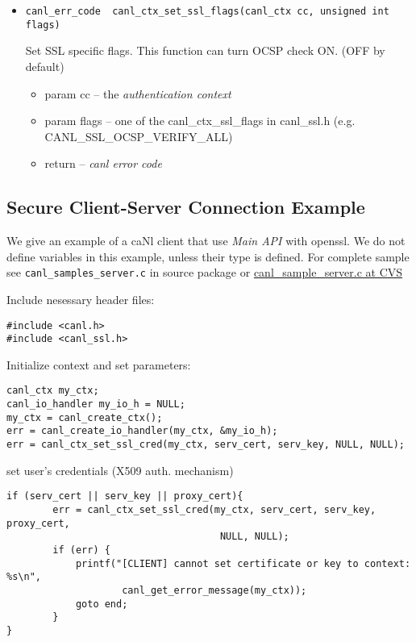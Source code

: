 \begin{itemize}
  \item \begin{verbatim}canl_err_code  canl_ctx_set_ssl_flags(canl_ctx cc, unsigned int flags) \end{verbatim}
  Set SSL specific flags. This function can turn OCSP check ON. 
  (OFF by default)
  \begin{itemize}
    \item param cc -- the \textit{authentication context}
    \item param flags -- one of the canl\_ctx\_ssl\_flags in canl\_ssl.h (e.g. 
  CANL\_SSL\_OCSP\_VERIFY\_ALL)
    \item return -- \textit{canl error code}
  \end{itemize}

\end{itemize}
\subsection{Secure Client-Server Connection Example}
We give an example of a caNl client that use \textit{Main API} 
with openssl. We do not define variables in this example, unless
their type is \CANL defined. For complete sample see 
{\tt canl\_samples\_server.c} in source package or \href{http://glite.cvs.cern.ch/cgi-bin/glite.cgi/emi.canl.canl-c/examples/canl\_sample\_server.c?revision=HEAD}{canl\_sample\_server.c at CVS}

Include nesessary header files:
\begin{lstlisting}
#include <canl.h>
#include <canl_ssl.h>
\end{lstlisting}

Initialize context and set parameters:
\begin{lstlisting}
canl_ctx my_ctx;
canl_io_handler my_io_h = NULL;
my_ctx = canl_create_ctx();
err = canl_create_io_handler(my_ctx, &my_io_h);
err = canl_ctx_set_ssl_cred(my_ctx, serv_cert, serv_key, NULL, NULL);
\end{lstlisting}

set user's credentials (X509 auth. mechanism)
\begin{lstlisting}
if (serv_cert || serv_key || proxy_cert){
        err = canl_ctx_set_ssl_cred(my_ctx, serv_cert, serv_key, proxy_cert,
                                     NULL, NULL);
        if (err) {
            printf("[CLIENT] cannot set certificate or key to context: %s\n",
                    canl_get_error_message(my_ctx));
            goto end;
        }
}
\end{lstlisting}

